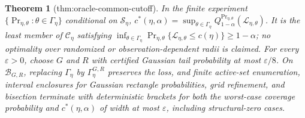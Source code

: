 \documentclass{article}
\newtheorem{theorem}{Theorem}
\begin{document}
\begin{theorem}[thm:oracle-common-cutoff]\label{thm:oracle-common-cutoff}
In the finite experiment \(\{\Pr_{\eta,\theta}:\theta\in\Gamma_\eta\}\) conditional on \(\mathscr S_\eta\), \(c^*(\eta,\alpha)=\sup_{\theta\in\Gamma_\eta}Q_{1-\alpha}^{\Pr_{\eta,\theta}}(\mathcal L_{\eta,\theta})\). It is the least member of \(\mathscr C_\eta\) satisfying \(\inf_{\theta\in\Gamma_\eta}\Pr_{\eta,\theta}\{\mathcal L_{\eta,\theta}\leq c(\eta)\}\geq1-\alpha\); no optimality over randomized or observation-dependent radii is claimed. For every \(\varepsilon>0\), choose \(G\) and \(R\) with certified Gaussian tail probability at most \(\varepsilon/8\). On \(\mathcal B_{G,R}\), replacing \(\Gamma_\eta\) by \(\Gamma_\eta^{G,R}\) preserves the loss, and finite active-set enumeration, interval enclosures for Gaussian rectangle probabilities, grid refinement, and bisection terminate with deterministic brackets for both the worst-case coverage probability and \(c^*(\eta,\alpha)\) of width at most \(\varepsilon\), including structural-zero cases.
\end{theorem}
\end{document}
